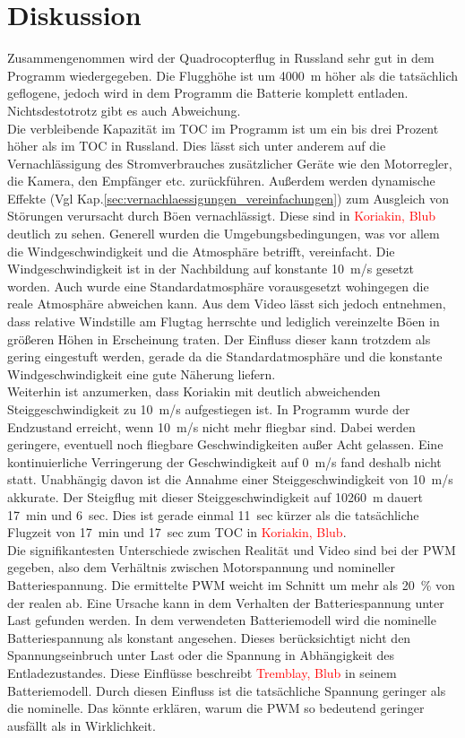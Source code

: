 \section{Diskussion}
\label{sec:nachbildung_diskussion}
Zusammengenommen wird der Quadrocopterflug in Russland sehr gut in dem Programm wiedergegeben. Die Flugghöhe ist um \SI{4000}{m} höher als die tatsächlich geflogene, jedoch wird in dem Programm die Batterie komplett entladen. Nichtsdestotrotz gibt es auch Abweichung.\\
Die verbleibende Kapazität im TOC im Programm ist um ein bis drei Prozent höher als im TOC in Russland. Dies lässt sich unter anderem auf die Vernachlässigung des Stromverbrauches zusätzlicher Geräte wie den Motorregler, die Kamera, den Empfänger etc. zurückführen. Außerdem werden dynamische Effekte (Vgl Kap.\ref{sec:vernachlaessigungen_vereinfachungen}) zum Ausgleich von Störungen verursacht durch Böen vernachlässigt. Diese sind in \textcolor{red}{Koriakin, Blub} deutlich zu sehen. Generell wurden die Umgebungsbedingungen, was vor allem die Windgeschwindigkeit und die Atmosphäre betrifft, vereinfacht. Die Windgeschwindigkeit ist in der Nachbildung auf konstante \SI{10}{m/s} gesetzt worden. Auch wurde eine Standardatmosphäre vorausgesetzt wohingegen die reale Atmosphäre abweichen kann. Aus dem Video lässt sich jedoch entnehmen, dass relative Windstille am Flugtag herrschte und lediglich vereinzelte Böen in größeren Höhen in Erscheinung traten. Der Einfluss dieser kann trotzdem als gering eingestuft werden, gerade da die Standardatmosphäre und die konstante Windgeschwindigkeit eine gute Näherung liefern. \\
Weiterhin ist anzumerken, dass Koriakin mit deutlich abweichenden Steiggeschwindigkeit zu \SI{10}{m/s} aufgestiegen ist. In Programm wurde der Endzustand erreicht, wenn \SI{10}{m/s} nicht mehr fliegbar sind. Dabei werden geringere, eventuell noch fliegbare Geschwindigkeiten außer Acht gelassen. Eine kontinuierliche Verringerung der Geschwindigkeit auf \SI{0}{m/s} fand deshalb nicht statt. Unabhängig davon ist die Annahme einer Steiggeschwindigkeit von \SI{10}{m/s} akkurate. Der Steigflug mit dieser Steiggeschwindigkeit auf \SI{10260}{m} dauert \SI{17}{min} und \SI{6}{sec}. Dies ist gerade einmal \SI{11}{sec} kürzer als die tatsächliche Flugzeit von \SI{17}{min} und \SI{17}{sec} zum TOC in \textcolor{red}{Koriakin, Blub}.\\
Die signifikantesten Unterschiede zwischen Realität und Video sind bei der PWM gegeben, also dem Verhältnis zwischen Motorspannung und nomineller Batteriespannung. Die ermittelte PWM weicht im Schnitt um mehr als \SI{20}{\%} von der realen ab. Eine Ursache kann in dem Verhalten der Batteriespannung unter Last gefunden werden. In dem verwendeten Batteriemodell wird die nominelle Batteriespannung als konstant angesehen. Dieses berücksichtigt nicht den Spannungseinbruch unter Last oder die Spannung in Abhängigkeit des Entladezustandes. Diese Einflüsse beschreibt \textcolor{red}{Tremblay, Blub} in seinem Batteriemodell. Durch diesen Einfluss ist die tatsächliche Spannung geringer als die nominelle. Das könnte erklären, warum die PWM so bedeutend geringer ausfällt als in Wirklichkeit. \\
